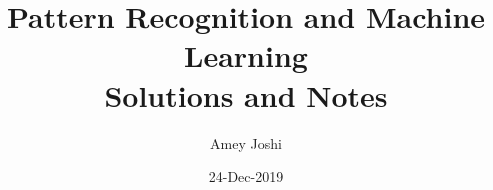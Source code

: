 \documentclass{report}
\title{Pattern Recognition and Machine Learning \\ Solutions and Notes}
\author{Amey Joshi}
\date{24-Dec-2019}
\begin{document}
\graphicspath{ {./images/} }
\begin{titlepage}
\maketitle
\thispagestyle{empty}
\end{titlepage}

\tableofcontents
\thispagestyle{empty}

%


\theoremstyle{plain}
\newtheorem{thm}{Theorem}[section]

\theoremstyle{plain}
\newtheorem{prop}{Proposition}[section]

\theoremstyle{plain}
\newtheorem{lem}{Lemma}[section]

\theoremstyle{plain}
\newtheorem{corr}{Corollary}[section]

\theoremstyle{definition}
\newtheorem{defn}{Definition}[section]

\theoremstyle{remark}
\newtheorem*{rem}{Remark}



%


\end{document}

